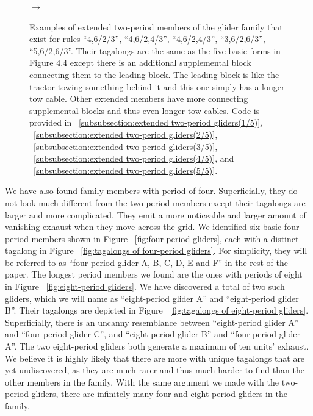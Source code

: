 \documentclass[12pt]{article}
\numberwithin{figure}{section} %
\begin{document}
\begin{figure}[H]
\begin{subfigure}{0.3\textwidth}
     \subcaption{}
   \end{subfigure}
      {\LARGE$\xrightarrow{}$}
   \setcounter{subfigure}{0}
   \caption[Extended two-period gliders]{Examples of extended two-period members of the glider family that exist for rules “4,6/2/3”, “4,6/2,4/3”, “4,6/2,4/3”, “3,6/2,6/3”, “5,6/2,6/3”. Their tagalongs are the same as the five basic forms in Figure 4.4 except there is an additional supplemental block connecting them to the leading block. The leading block is like the tractor towing something behind it and this one simply has a longer tow cable. Other extended members have more connecting supplemental blocks and thus even longer tow cables. Code is provided in ~\ref{subsubsection:extended two-period gliders(1/5)}, ~\ref{subsubsection:extended two-period gliders(2/5)}, ~\ref{subsubsection:extended two-period gliders(3/5)}, ~\ref{subsubsection:extended two-period gliders(4/5)}, and ~\ref{subsubsection:extended two-period gliders(5/5)}. }
   \label{fig:extended two-period gliders}
   \vspace{-1.5em}
\end{figure}

We have also found family members with period of four. Superficially, they do not look much different from the two-period members except their tagalongs are larger and more complicated. They emit a more noticeable and larger amount of vanishing exhaust when they move across the grid. We identified six basic four-period members shown in Figure ~\ref{fig:four-period gliders}, each with a distinct tagalong in Figure ~\ref{fig:tagalongs of four-period gliders}. For simplicity, they will be referred to as “four-period glider A, B, C, D, E and F” in the rest of the paper. The longest period members we found are the ones with periods of eight in Figure ~\ref{fig:eight-period gliders}. We have discovered a total of two such gliders, which we will name as “eight-period glider A” and “eight-period glider B”. Their tagalongs are depicted in Figure ~\ref{fig:tagalongs of eight-period gliders}. Superficially, there is an uncanny resemblance between “eight-period glider A” and “four-period glider C”, and “eight-period glider B” and “four-period glider A”. The two eight-period gliders both generate a maximum of ten units’ exhaust. We believe it is highly likely that there are more with unique tagalongs that are yet undiscovered, as they are much rarer and thus much harder to find than the other members in the family. With the same argument we made with the two-period gliders, there are infinitely many four and eight-period gliders in the family. 
\end{document}
